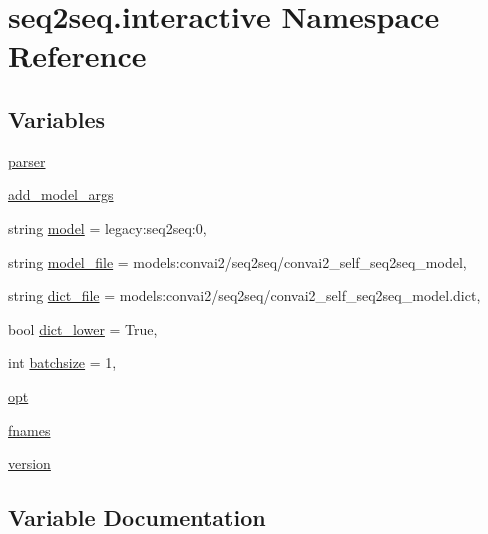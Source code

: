 \hypertarget{namespaceseq2seq_1_1interactive}{}\section{seq2seq.\+interactive Namespace Reference}
\label{namespaceseq2seq_1_1interactive}
\subsection*{Variables}
\begin{DoxyCompactItemize}
\item 
\hyperlink{namespaceseq2seq_1_1interactive_a30c7c17d3501869dc954ba79b1bb1703}{parser}
\item 
\hyperlink{namespaceseq2seq_1_1interactive_aec2c50a53ca35f8f5f1432d9feb2d678}{add\+\_\+model\+\_\+args}
\item 
string \hyperlink{namespaceseq2seq_1_1interactive_ab600d561e441080eb3d68e22f9610b4b}{model} = \textquotesingle{}legacy\+:seq2seq\+:0\textquotesingle{},
\item 
string \hyperlink{namespaceseq2seq_1_1interactive_a4961a7a68f85649f318565d94d343b0d}{model\+\_\+file} = \textquotesingle{}models\+:convai2/seq2seq/convai2\+\_\+self\+\_\+seq2seq\+\_\+model\textquotesingle{},
\item 
string \hyperlink{namespaceseq2seq_1_1interactive_aa4f3ad0ec703a257baf585773e2e1d7a}{dict\+\_\+file} = \textquotesingle{}models\+:convai2/seq2seq/convai2\+\_\+self\+\_\+seq2seq\+\_\+model.\+dict\textquotesingle{},
\item 
bool \hyperlink{namespaceseq2seq_1_1interactive_a895b98f538fc182cbfe772e10ddb79ff}{dict\+\_\+lower} = True,
\item 
int \hyperlink{namespaceseq2seq_1_1interactive_abe753d056cab714a7dad5ee5d69be232}{batchsize} = 1,
\item 
\hyperlink{namespaceseq2seq_1_1interactive_a6a0cb415a1fef0f71edba01a96d53dba}{opt}
\item 
\hyperlink{namespaceseq2seq_1_1interactive_ae4bce1ba727d000850c523634c304917}{fnames}
\item 
\hyperlink{namespaceseq2seq_1_1interactive_ae79ed748b505aa1b31aab802d43545df}{version}
\end{DoxyCompactItemize}


\subsection{Variable Documentation}
\mbox{\label{namespaceseq2seq_1_1interactive_aec2c50a53ca35f8f5f1432d9feb2d678}} 
